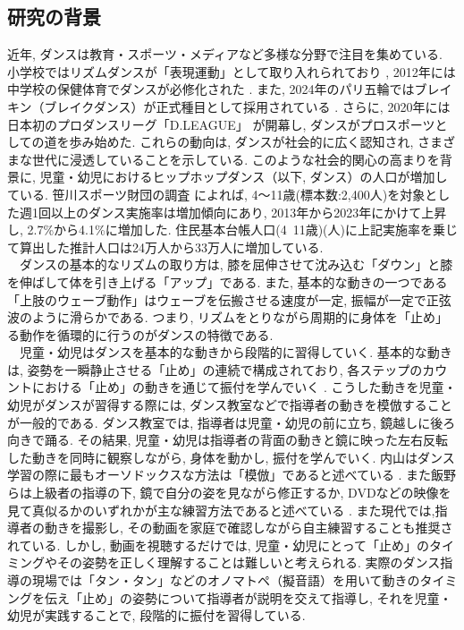 \documentclass[technicalreport]{ieicej}
\begin{document}
\subsection{研究の背景}
近年, ダンスは教育・スポーツ・メディアなど多様な分野で注目を集めている. 小学校ではリズムダンスが「表現運動」として取り入れられており \cite{ref1}, 2012年には中学校の保健体育でダンスが必修化された \cite{ref2}. また, 2024年のパリ五輪ではブレイキン（ブレイクダンス）が正式種目として採用されている \cite{ref3}. さらに, 2020年には日本初のプロダンスリーグ「D.LEAGUE」 \cite{ref4}が開幕し, ダンスがプロスポーツとしての道を歩み始めた. これらの動向は, ダンスが社会的に広く認知され, さまざまな世代に浸透していることを示している. このような社会的関心の高まりを背景に, 児童・幼児におけるヒップホップダンス（以下, ダンス）の人口が増加している. 笹川スポーツ財団の調査 \cite{ref5} によれば, 4〜11歳(標本数:2,400人)を対象とした週1回以上のダンス実施率は増加傾向にあり, 2013年から2023年にかけて上昇し, 2.7\%から4.1\%に増加した. 住民基本台帳人口(4~11歳)(人)に上記実施率を乗じて算出した推計人口は24万人から33万人に増加している. \\
　ダンスの基本的なリズムの取り方は, 膝を屈伸させて沈み込む「ダウン」と膝を伸ばして体を引き上げる「アップ」である\cite{ref7}. また, 基本的な動きの一つである「上肢のウェーブ動作」はウェーブを伝搬させる速度が一定, 振幅が一定で正弦波のように滑らかである. つまり, リズムをとりながら周期的に身体を「止め」る動作を循環的に行うのがダンスの特徴である. \\
　児童・幼児はダンスを基本的な動きから段階的に習得していく. 基本的な動きは, 姿勢を一瞬静止させる「止め」の連続で構成されており, 各ステップのカウントにおける「止め」の動きを通じて振付を学んでいく \cite{ref7}. こうした動きを児童・幼児がダンスが習得する際には, ダンス教室などで指導者の動きを模倣することが一般的である. ダンス教室では, 指導者は児童・幼児の前に立ち, 鏡越しに後ろ向きで踊る. その結果, 児童・幼児は指導者の背面の動きと鏡に映った左右反転した動きを同時に観察しながら, 身体を動かし, 振付を学んでいく. 内山はダンス学習の際に最もオーソドックスな方法は「模倣」であると述べている \cite{ref8}. また飯野らは上級者の指導の下, 鏡で自分の姿を見ながら修正するか, DVDなどの映像を見て真似るかのいずれかが主な練習方法であると述べている \cite{ref9}. また現代では,指導者の動きを撮影し, その動画を家庭で確認しながら自主練習することも推奨されている. しかし, 動画を視聴するだけでは, 児童・幼児にとって「止め」のタイミングやその姿勢を正しく理解することは難しいと考えられる. 実際のダンス指導の現場では「タン・タン」などのオノマトペ（擬音語）を用いて動きのタイミングを伝え「止め」の姿勢について指導者が説明を交えて指導し, それを児童・幼児が実践することで, 段階的に振付を習得している. 
\end{document}
